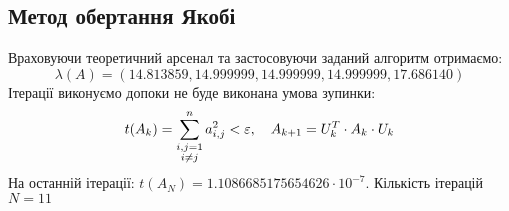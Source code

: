 \subsection{Метод обертання Якобі}

Враховуючи теоретичний арсенал та застосовуючи заданий алгоритм отримаємо: \[ \lambda(A) = (14.813859, 14.999999, 14.999999, 14.999999, 17.686140)\]
Ітерації виконуємо допоки не буде виконана умова зупинки: \[t(A_k) = \displaystyle\sum\limits_{\substack{i,j = 1\\i\ne j}}^n a_{i,j}^2 < \varepsilon, \quad A_{k+1} = U_k^T \cdot A_k \cdot U_k \]
На останній ітерації: $t(A_N) = 1.1086685175654626\cdot10^{-7}$. Кількість ітерацій $N = 11$

